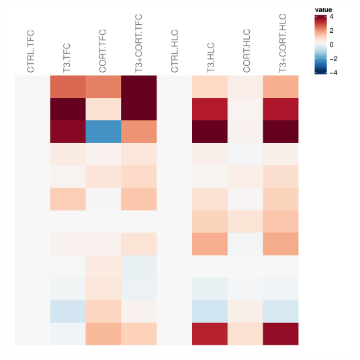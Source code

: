 \begin{figure}[!htbp]
\centering
\vspace{1\baselineskip}
%
%
\begin{subfigure}{0.45\textwidth}
	\includegraphics[width=\textwidth]
	{Figures/comparison-tfc-hlc-htsig/comparison-tfc-hlc-htsig-all.pdf}
	\caption{}
	\label{subfig:comparison-tfc-hlc-htsig-all}
\end{subfigure}
~
\begin{subfigure}{0.45\textwidth}

\end{subfigure}
\end{figure}
